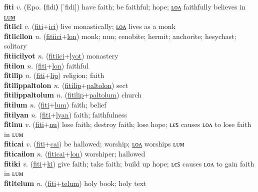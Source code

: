 \textbf{fiti} \textit{v.} (Epo. ⟨fidi⟩ [ˈfidi])
have faith; be faithful; hope; \hyperref[fitilon]{ʟᴏᴧ} faithfully believes in \hyperref[fitilum]{ʟᴜᴍ} \label{fiti} \\
\textbf{fitiici} \textit{v.} (\hyperref[fiti]{fiti}+\hyperref[ici]{ici})
live monastically; \hyperref[fitiicilon]{ʟᴏᴧ} lives as a monk \label{fitiici} \\
\textbf{fitiicilon} \textit{n.} (\hyperref[fitiici]{fitiici}+\hyperref[lon]{lon})
monk; nun; cenobite; hermit; anchorite; hesychast; solitary \label{fitiicilon} \\
\textbf{fitiicilyot} \textit{n.} (\hyperref[fitiici]{fitiici}+\hyperref[lyot]{lyot})
monastery \label{fitiicilyot} \\
\textbf{fitilon} \textit{n.} (\hyperref[fiti]{fiti}+\hyperref[lon]{lon})
faithful \label{fitilon} \\
\textbf{fitilip} \textit{n.} (\hyperref[fiti]{fiti}+\hyperref[lip]{lip})
religion; faith \label{fitilip} \\
\textbf{fitilippaltolon} \textit{n.} (\hyperref[fitilip]{fitilip}+\hyperref[paltolon]{paltolon})
sect \label{fitilippaltolon} \\
\textbf{fitilippaltolum} \textit{n.} (\hyperref[fitilip]{fitilip}+\hyperref[paltolum]{paltolum})
church \label{fitilippaltolum} \\
\textbf{fitilum} \textit{n.} (\hyperref[fiti]{fiti}+\hyperref[lum]{lum})
faith; belief \label{fitilum} \\
\textbf{fitilyan} \textit{n.} (\hyperref[fiti]{fiti}+\hyperref[lyan]{lyan})
faith; faithfulness \label{fitilyan} \\
\textbf{fitinu} \textit{v.} (\hyperref[fiti]{fiti}+\hyperref[nu]{nu})
lose faith; destroy faith; lose hope; ʟєꜱ causes ʟᴏᴧ to lose faith in ʟᴜᴍ \label{fitinu} \\
\textbf{fiticai} \textit{v.} (\hyperref[fiti]{fiti}+\hyperref[cai]{cai})
be hallowed; worship; \hyperref[fiticailon]{ʟᴏᴧ} worships ʟᴜᴍ \label{fiticai} \\
\textbf{fiticailon} \textit{n.} (\hyperref[fiticai]{fiticai}+\hyperref[lon]{lon})
worshiper; hallowed \label{fiticailon} \\
\textbf{fitiki} \textit{v.} (\hyperref[fiti]{fiti}+\hyperref[ki]{ki})
give faith; take faith; build up hope; ʟєꜱ causes ʟᴏᴧ to gain faith in ʟᴜᴍ \label{fitiki} \\
\textbf{fititelum} \textit{n.} (\hyperref[fiti]{fiti}+\hyperref[telum]{telum})
holy book; holy text \label{fititelum} \\
